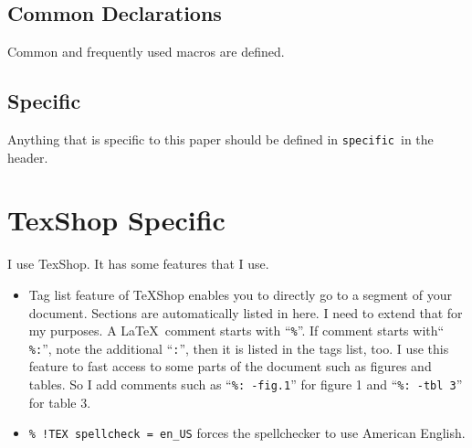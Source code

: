 \documentclass[10pt,journal,compsoc]{IEEEtran}
\newcommand{\hCode}[1]{\texttt{#1}}
\theoremstyle{plain}
\theoremstyle{definition}
\theoremstyle{remark}
\newcommand{\hbSSpecific}{\hCode{specific}}
\begin{document}
\subsection{Common Declarations}

Common and frequently used macros are defined.




\subsection{Specific}

Anything that is specific to this paper should be defined in \hbSSpecific\ in the header.




\section{TexShop Specific}

I use TexShop.
It has some features that I use.
\begin{itemize}

	\item
	Tag list feature of TeXShop enables you to directly go to a segment of your document.
	Sections are automatically listed in here.
	I need to extend that for my purposes.
	A \LaTeX\  comment starts with ``\hCode{\%}''.
	If comment starts with`` \hCode{\%:}'',
	note the additional ``\hCode{:}'',
	then it is listed in the tags list, too.
	I use this feature to fast access to some parts of the document such as figures and tables.
	So I add comments such as 
	``\hCode{\%: -fig.1}'' for figure 1 and
	``\hCode{\%: -tbl 3}'' for table 3.
	
	\item 
	\hCode{\% !TEX spellcheck = en\_US} forces the spellchecker to use American English.
	
\end{itemize}










\listofchanges   %
\end{document}
